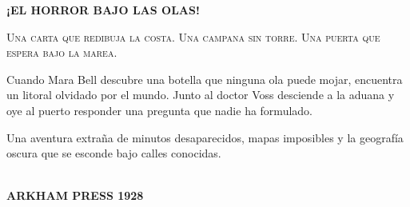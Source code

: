 \thispagestyle{empty}
\pagecolor{DeepSea}
\color{OldPaper}
\vspace*{12mm}
\begin{center}
  {\Huge\bfseries ¡EL HORROR BAJO LAS OLAS!\par}
  \vspace{1em}
  {\Large\scshape Una carta que redibuja la costa. Una campana sin torre.
  Una puerta que espera bajo la marea.\par}
  \vspace{2em}
\end{center}
\noindent Cuando Mara Bell descubre una botella que ninguna ola puede mojar,
encuentra un litoral olvidado por el mundo. Junto al doctor Voss desciende
a la aduana y oye al puerto responder una pregunta que nadie ha formulado.

\medskip
\noindent Una aventura extraña de minutos desaparecidos, mapas imposibles y
la geografía oscura que se esconde bajo calles conocidas.

\vfill
\begin{center}
  \PulpBarcode\\[1em]
  {\sffamily\bfseries ARKHAM PRESS \textbullet{} 1928}
\end{center}
\clearpage
\pagecolor{white}
\color{Ink}
